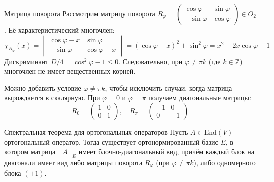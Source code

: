 \begin{Example}{Матрица поворота}{}
	Рассмотрим матрицу поворота $R_\varphi = \begin{pmatrix} \cos\varphi & \sin\varphi \\ -\sin\varphi & \cos\varphi \end{pmatrix} \in O_2$.
	Её характеристический многочлен:
	\[
	\chi_{R_\varphi}(x) = \begin{vmatrix} \cos\varphi - x & \sin\varphi \\ -\sin\varphi & \cos\varphi - x \end{vmatrix} = (\cos\varphi - x)^2 + \sin^2\varphi = x^2 - 2x\cos\varphi + 1
	\]
	Дискриминант $D/4 = \cos^2\varphi - 1 \le 0$. Следовательно, при $\varphi \neq \pi k$ (где $k \in \mathbb{Z}$) многочлен не имеет вещественных корней.
\end{Example}

\begin{Remark}{}{}
	Можно добавить условие $\varphi \neq \pi k$, чтобы исключить случаи, когда матрица вырождается в скалярную. При $\varphi = 0$ и $\varphi = \pi$ получаем диагональные матрицы:
	\[
	R_0 = \begin{pmatrix} 1 & 0 \\ 0 & 1 \end{pmatrix}, \quad R_\pi = \begin{pmatrix} -1 & 0 \\ 0 & -1 \end{pmatrix}
	\]
\end{Remark}

\begin{Theorem}{Спектральная теорема для ортогональных операторов}{}
	Пусть $A \in \mathrm{End}(V)$ — ортогональный оператор. Тогда существует ортонормированный базис $E$, в котором матрица $[A]_E$ имеет блочно-диагональный вид, причём каждый блок на диагонали имеет вид либо матрицы поворота $R_\varphi$ (при $\varphi \neq \pi k$), либо одномерного блока $(\pm 1)$.
\end{Theorem}